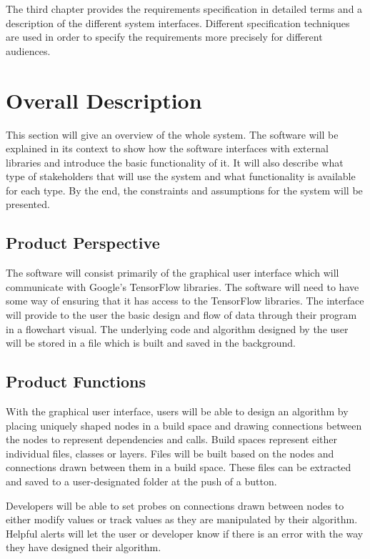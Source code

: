 \documentclass[journal,10pt,onecolumn,compsoc]{IEEEtran} \usepackage[margin=1.0in]{geometry} \usepackage{pdfpages} \usepackage{graphicx}
\begin{document}
The third chapter provides the requirements specification in detailed terms and a description of the different system interfaces. 
Different specification techniques are used in order to specify the requirements more precisely for different audiences.

\newpage

\section{Overall Description}

This section will give an overview of the whole system. 
The software will be explained in its context to show how the software interfaces with external libraries and introduce the basic functionality of it. 
It will also describe what type of stakeholders that will use the system and what functionality is available for each type. 
By the end, the constraints and assumptions for the system will be presented.

\subsection{Product Perspective}

The software will consist primarily of the graphical user interface which will communicate with Google's TensorFlow libraries. 
The software will need to have some way of ensuring that it has access to the TensorFlow libraries. 
The interface will provide to the user the basic design and flow of data through their program in a flowchart visual.
The underlying code and algorithm designed by the user will be stored in a file which is built and saved in the background. 

\subsection{Product Functions}

With the graphical user interface, users will be able to design an algorithm by placing uniquely shaped nodes in a build space and drawing connections between the nodes to represent dependencies and calls.
Build spaces represent either individual files, classes or layers. 
Files will be built based on the nodes and connections drawn between them in a build space.
These files can be extracted and saved to a user-designated folder at the push of a button.

Developers will be able to set probes on connections drawn between nodes to either modify values or track values as they are manipulated by their algorithm.
Helpful alerts will let the user or developer know if there is an error with the way they have designed their algorithm.
\end{document}
